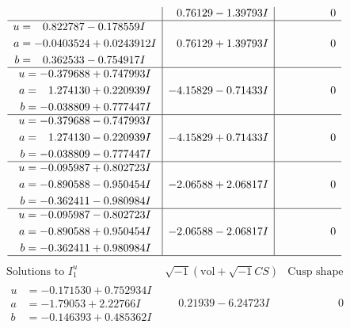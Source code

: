 \documentclass[1p]{elsarticle_modified}
\theoremstyle{definition}
\newcommand{\I}{\sqrt{-1}}
\begin{document}
$$\begin{array}{c|c|c}
 & \phantom{-}0.76129 - 1.39793 I & \phantom{-0.000000 } 0 \\ \hline\begin{aligned}
u &= \phantom{-}0.822787 - 0.178559 I \\
a &= -0.0403524 + 0.0243912 I \\
b &= \phantom{-}0.362533 - 0.754917 I\end{aligned}
 & \phantom{-}0.76129 + 1.39793 I & \phantom{-0.000000 } 0 \\ \hline\begin{aligned}
u &= -0.379688 + 0.747993 I \\
a &= \phantom{-}1.274130 + 0.220939 I \\
b &= -0.038809 + 0.777447 I\end{aligned}
 & -4.15829 - 0.71433 I & \phantom{-0.000000 } 0 \\ \hline\begin{aligned}
u &= -0.379688 - 0.747993 I \\
a &= \phantom{-}1.274130 - 0.220939 I \\
b &= -0.038809 - 0.777447 I\end{aligned}
 & -4.15829 + 0.71433 I & \phantom{-0.000000 } 0 \\ \hline\begin{aligned}
u &= -0.095987 + 0.802723 I \\
a &= -0.890588 - 0.950454 I \\
b &= -0.362411 - 0.980984 I\end{aligned}
 & -2.06588 + 2.06817 I & \phantom{-0.000000 } 0 \\ \hline\begin{aligned}
u &= -0.095987 - 0.802723 I \\
a &= -0.890588 + 0.950454 I \\
b &= -0.362411 + 0.980984 I\end{aligned}
 & -2.06588 - 2.06817 I & \phantom{-0.000000 } 0\\
 \hline 
 \end{array}$$\newpage$$\begin{array}{c|c|c}  
\text{Solutions to }I^u_{1}& \I (\text{vol} + \sqrt{-1}CS) & \text{Cusp shape}\\
 \hline 
\begin{aligned}
u &= -0.171530 + 0.752934 I \\
a &= -1.79053 + 2.22766 I \\
b &= -0.146393 + 0.485362 I\end{aligned}
 & \phantom{-}0.21939 - 6.24723 I & \phantom{-0.000000 } 0 \\ \hline\begin{aligned}

\end{aligned}
\end{array}$$
\end{document}
